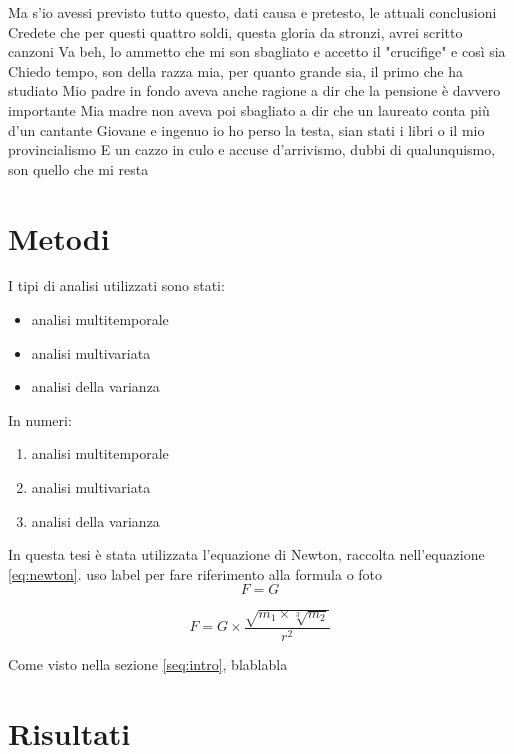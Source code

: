 \documentclass[12pt]{article}
\begin{document}
 Ma s'io avessi previsto tutto questo, dati causa e pretesto, le attuali conclusioni
Credete che per questi quattro soldi, questa gloria da stronzi, avrei scritto canzoni
Va beh, lo ammetto che mi son sbagliato e accetto il "crucifige" e così sia
Chiedo tempo, son della razza mia, per quanto grande sia, il primo che ha studiato
Mio padre in fondo aveva anche ragione a dir che la pensione è davvero importante
Mia madre non aveva poi sbagliato a dir che un laureato conta più d'un cantante
Giovane e ingenuo io ho perso la testa, sian stati i libri o il mio provincialismo
E un cazzo in culo e accuse d'arrivismo, dubbi di qualunquismo, son quello che mi resta   


\section{Metodi}
I tipi di analisi utilizzati sono stati:
\begin{itemize}
    \item analisi multitemporale
    \item analisi multivariata
    \item analisi della varianza
\end{itemize}


\noindent In numeri:
\begin{enumerate}
    \item analisi multitemporale
    \item analisi multivariata
    \item analisi della varianza
\end{enumerate}

\bigskip


In questa tesi è stata utilizzata l'equazione di Newton, 
raccolta nell'equazione \ref{eq:newton}. uso label per fare riferimento alla formula o foto 
\begin{equation}
    F = G
\end{equation}

\begin{equation}
    F = G \times \frac{\sqrt{m_1 \times \sqrt[3]{m_2}}}{r^2}
    \label{eq:newton}
\end{equation}

Come visto nella sezione \ref{seq:intro}, blablabla

\section{Risultati}
\end{document}
